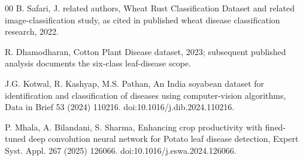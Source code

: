 \documentclass[a4paper,fleqn]{cas-dc}
\begin{document}
\begin{thebibliography}{00}
B. Safari, J. related authors, Wheat Rust Classification Dataset and related image-classification study, as cited in published wheat disease classification research, 2022.

R. Dhamodharan, Cotton Plant Disease dataset, 2023; subsequent published analysis documents the six-class leaf-disease scope.

J.G. Kotwal, R. Kashyap, M.S. Pathan, An India soyabean dataset for identification and classification of diseases using computer-vision algorithms, Data in Brief 53 (2024) 110216. doi:10.1016/j.dib.2024.110216.

P. Mhala, A. Bilandani, S. Sharma, Enhancing crop productivity with fined-tuned deep convolution neural network for Potato leaf disease detection, Expert Syst. Appl. 267 (2025) 126066. doi:10.1016/j.eswa.2024.126066.

\end{thebibliography}
\end{document}
